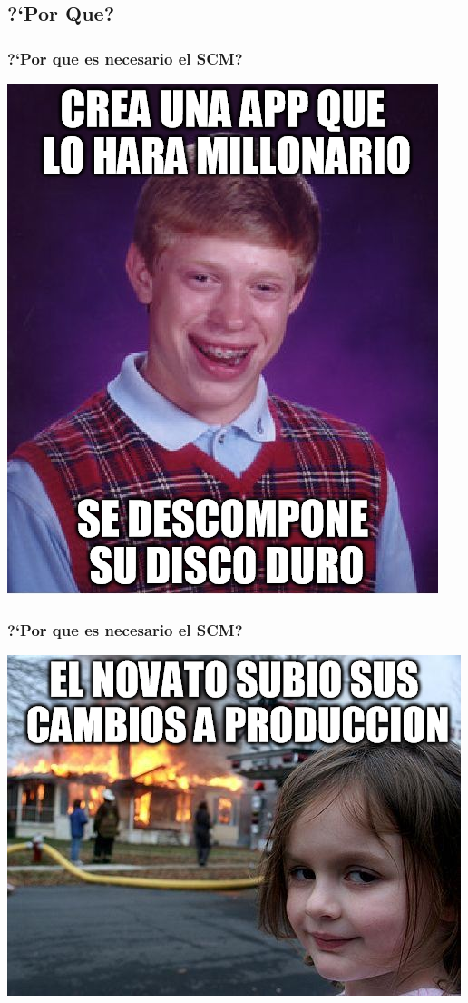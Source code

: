 \subsection{?`Por Que?}
\begin{frame}
\frametitle{?`Por que es necesario el SCM?}
\begin{center}
\includegraphics[scale=0.3]{MalDiscoDuro.png}
\end{center}
\end{frame}

\begin{frame}
\frametitle{?`Por que es necesario el SCM?}
\begin{center}
\includegraphics[scale=0.3]{CambiosAProduccion.png}
\end{center}
\end{frame}

